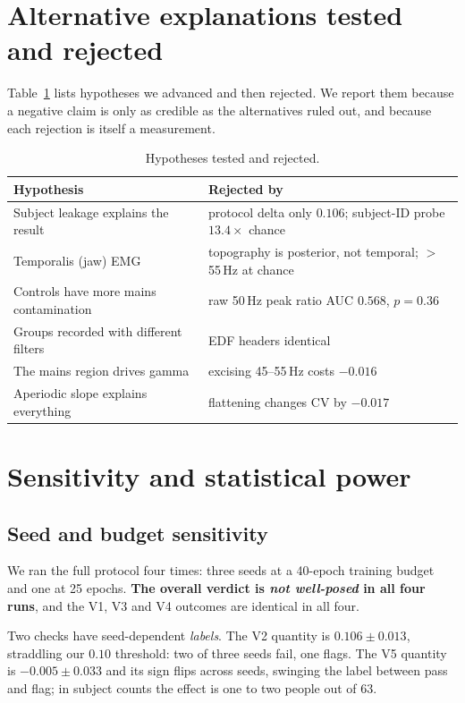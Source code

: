 \documentclass[10pt,conference]{IEEEtran}
\begin{document}
\section{Alternative explanations tested and rejected}

Table~\ref{tab:rejected} lists hypotheses we advanced and then rejected. We
report them because a negative claim is only as credible as the alternatives
ruled out, and because each rejection is itself a measurement.

\begin{table}[t]
\caption{Hypotheses tested and rejected.}
\label{tab:rejected}
\centering
\small
\begin{tabular}{@{}lp{4.3cm}@{}}
\toprule
\textbf{Hypothesis} & \textbf{Rejected by} \\
\midrule
Subject leakage explains the result & protocol delta only $0.106$; subject-ID probe $13.4\times$ chance \\
Temporalis (jaw) EMG & topography is posterior, not temporal; $>$55\,Hz at chance \\
Controls have more mains contamination & raw 50\,Hz peak ratio AUC $0.568$, $p=0.36$ \\
Groups recorded with different filters & EDF headers identical \\
The mains region drives gamma & excising 45--55\,Hz costs $-0.016$ \\
Aperiodic slope explains everything & flattening changes CV by $-0.017$ \\
\bottomrule
\end{tabular}
\end{table}

\section{Sensitivity and statistical power}

\subsection{Seed and budget sensitivity}\label{sec:sens}
We ran the full protocol four times: three seeds at a 40-epoch training budget
and one at 25 epochs. \textbf{The overall verdict is \emph{not well-posed} in
all four runs}, and the V1, V3 and V4 outcomes are identical in all four.

Two checks have seed-dependent \emph{labels}. The V2 quantity is
$0.106\pm0.013$, straddling our $0.10$ threshold: two of three seeds fail, one
flags. The V5 quantity is $-0.005\pm0.033$ and its sign flips across seeds,
swinging the label between pass and flag; in subject counts the effect is one to
two people out of 63.
\end{document}
